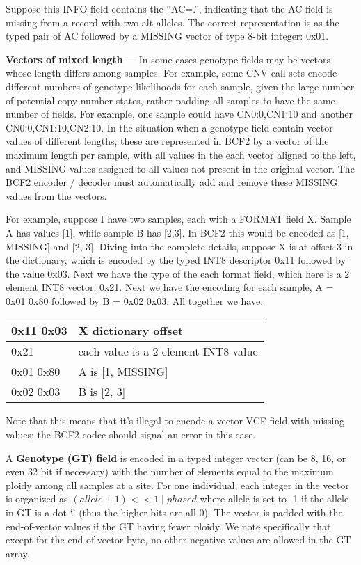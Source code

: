 \documentclass[8pt]{article}
\begin{document}
Suppose this INFO field contains the ``AC=.'', indicating that the AC field is missing from a record with two alt alleles.  The correct representation is as the typed pair of AC followed by a MISSING vector of type 8-bit integer: 0x01.

\vspace{0.3cm}
\textbf{Vectors of mixed length} --- In some cases genotype fields may be vectors whose length differs among samples.  For example, some CNV call sets encode different numbers of genotype likelihoods for each sample, given the large number of potential copy number states, rather padding all samples to have the same number of fields.  For example, one sample could have CN0:0,CN1:10 and another CN0:0,CN1:10,CN2:10.  In the situation when a genotype field contain vector values of different lengths, these are represented in BCF2 by a vector of the maximum length per sample, with all values in the each vector aligned to the left, and MISSING values assigned to all values not present in the original vector.  The BCF2 encoder / decoder must automatically add and remove these MISSING values from the vectors.

For example, suppose I have two samples, each with a FORMAT field X.  Sample A has values [1], while sample B has [2,3].  In BCF2 this would be encoded as [1, MISSING] and [2, 3].  Diving into the complete details, suppose X is at offset 3 in the dictionary, which is encoded by the typed INT8 descriptor 0x11 followed by the value 0x03.  Next we have the type of the each format field, which here is a 2 element INT8 vector: 0x21.  Next we have the encoding for each sample, A = 0x01 0x80 followed by B = 0x02 0x03.  All together we have:

\vspace{0.3cm}
\begin{tabular}{|p{2cm} | l |} \hline
0x11 0x03 & X dictionary offset \\ \hline
0x21 & each value is a 2 element INT8 value \\ \hline
0x01 0x80 & A is [1, MISSING] \\ \hline
0x02 0x03 & B is [2, 3] \\ \hline
\end{tabular}
\vspace{0.3cm}

Note that this means that it's illegal to encode a vector VCF field with missing values; the BCF2 codec should signal an error in this case.

\vspace{0.3cm}
A \textbf{Genotype (GT) field} is encoded in a typed integer vector (can be 8,
16, or even 32 bit if necessary) with the number of elements equal to the
maximum ploidy among all samples at a site.  For one individual, each integer
in the vector is organized as $(allele+1) << 1 \mid phased$ where allele is set
to -1 if the allele in GT is a dot `.' (thus the higher bits are all 0). 
The vector is padded with the end-of-vector values if the GT having fewer ploidy.
We note specifically that except for the end-of-vector byte, no other negative
values are allowed in the GT array.
\end{document}
